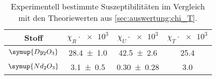 \begin{table}
  \centering
  \caption{Experimentell bestimmte Suszeptibilitäten im Vergleich mit den Theoriewerten aus \autoref{sec:auswertung:chi_T}.}
  \label{tab:chi_all}
  \begin{tabular}{c c c S}
  \toprule
  Stoff &
  $\chi_R \cdot \num{e3}$ &
  $\chi_U \cdot \num{e3}$ &
  $\chi_T \cdot \num{e3}$ \\
  \midrule
  $\symup{Dy_2O_3}$ & \num{28.4 \pm 1.0} & \num{42.5 \pm 2.6}  & 25.4 \\
  $\symup{Nd_2O_3}$ & \num{3.1 \pm 0.5}  & \num{0.30 \pm 0.28} & 3.0  \\
  \bottomrule
  \end{tabular}
\end{table}
